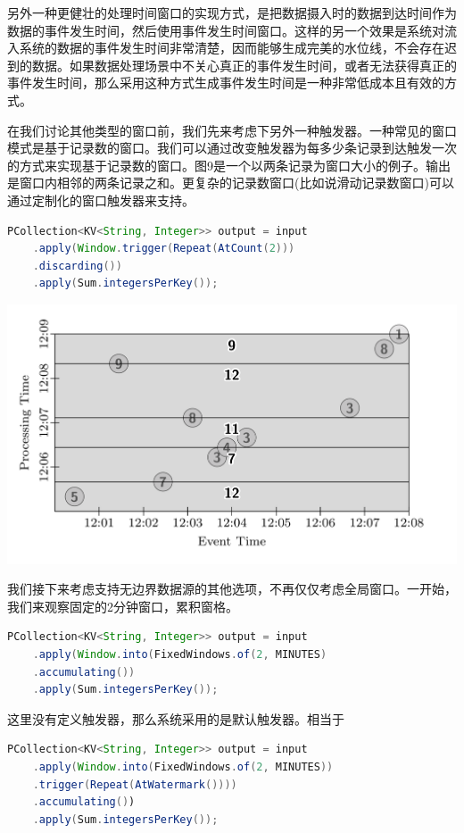 \documentclass[oneside]{ctexbook}
\begin{document}
另外一种更健壮的处理时间窗口的实现方式，是把数据摄入时的数据到达时间作为数据的事件发生时间，然后使用事件发生时间窗口。这样的另一个效果是系统对流入系统的数据的事件发生时间非常清楚，因而能够生成完美的水位线，不会存在迟到的数据。如果数据处理场景中不关心真正的事件发生时间，或者无法获得真正的事件发生时间，那么采用这种方式生成事件发生时间是一种非常低成本且有效的方式。

在我们讨论其他类型的窗口前，我们先来考虑下另外一种触发器。一种常见的窗口模式是基于记录数的窗口。我们可以通过改变触发器为每多少条记录到达触发一次的方式来实现基于记录数的窗口。图9是一个以两条记录为窗口大小的例子。输出是窗口内相邻的两条记录之和。更复杂的记录数窗口(比如说滑动记录数窗口)可以通过定制化的窗口触发器来支持。

\begin{lstlisting}[language=java]
PCollection<KV<String, Integer>> output = input
    .apply(Window.trigger(Repeat(AtCount(2)))
    .discarding())
    .apply(Sum.integersPerKey());
\end{lstlisting}

\noindent \includegraphics[width=\textwidth]{atcount.png}

我们接下来考虑支持无边界数据源的其他选项，不再仅仅考虑全局窗口。一开始，我们来观察固定的2分钟窗口，累积窗格。

\begin{lstlisting}[language=java]
PCollection<KV<String, Integer>> output = input
    .apply(Window.into(FixedWindows.of(2, MINUTES)
    .accumulating())
    .apply(Sum.integersPerKey());
\end{lstlisting}

这里没有定义触发器，那么系统采用的是默认触发器。相当于

\begin{lstlisting}[language=java]
PCollection<KV<String, Integer>> output = input
    .apply(Window.into(FixedWindows.of(2, MINUTES))
    .trigger(Repeat(AtWatermark())))
    .accumulating())
    .apply(Sum.integersPerKey());
\end{lstlisting}
\end{document}
